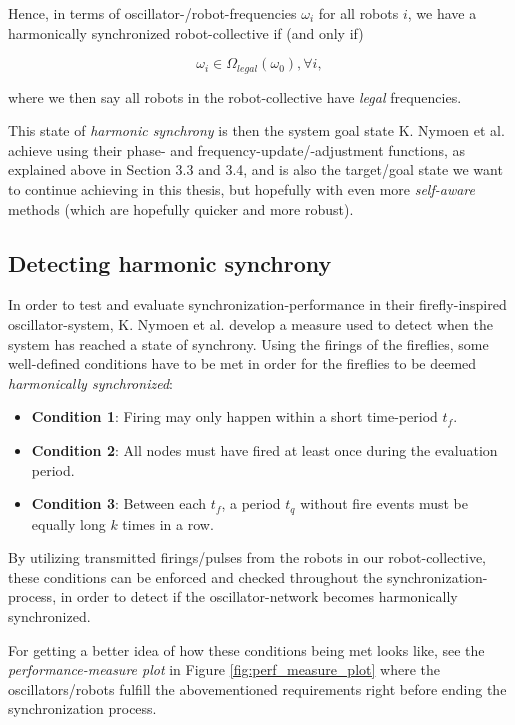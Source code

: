 		Hence, in terms of oscillator-/robot-frequencies $\omega_i$ for all robots $i$, we have a harmonically synchronized robot-collective if (and only if)

		\begin{equation}\label{synced_freqs}
		\omega_i \in \Omega_{legal}(\omega_0) , \forall i ,
		\end{equation}

		where we then say all robots in the robot-collective have \textit{legal} frequencies.



		This state of \textit{harmonic synchrony} is then the system goal state K. Nymoen et al. achieve using their phase- and frequency-update/-adjustment functions, as explained above in Section 3.3 and 3.4, and is also the target/goal state we want to continue achieving in this thesis, but hopefully with even more \textit{self-aware} methods (which are hopefully quicker and more robust).


			\subsection{Detecting harmonic synchrony}
			\label{subsec:harmonic_synchrony}
			In order to test and evaluate synchronization-performance in their firefly-inspired oscillator-system, K. Nymoen et al. \cite{nymoen_synch} develop a measure used to detect when the system has reached a state of synchrony. Using the firings of the fireflies, some well-defined conditions have to be met in order for the fireflies to be deemed \textit{harmonically synchronized}:
			\begin{itemize}
				\item \textbf{Condition 1}: Firing may only happen within a short time-period $t_f$.
				\item \textbf{Condition 2}: All nodes must have fired at least once during the evaluation period.
				\item \textbf{Condition 3}: Between each $t_f$, a period $t_q$ without fire events must be equally long $k$ times in a row.
			\end{itemize}
			
			By utilizing transmitted firings/pulses from the robots in our robot-collective, these conditions can be enforced and checked throughout the synchronization-process, in order to detect if the oscillator-network becomes harmonically synchronized.
			
			For getting a better idea of how these conditions being met looks like, see the \textit{performance-measure plot} in Figure \ref{fig:perf_measure_plot} where the oscillators/robots fulfill the abovementioned requirements right before ending the synchronization process.
			
